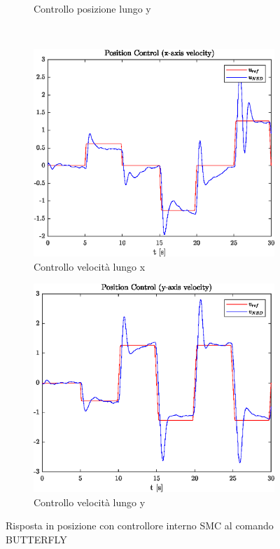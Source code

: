 \begin{figure}
\begin{subfigure}{0.45\textwidth}
		\caption{Controllo posizione lungo y}
	\end{subfigure}
	\\
	\begin{subfigure}{0.45\textwidth}
		\centering
		\includegraphics[width=1\textwidth]{Simulazioni/Figure/SMC/BUTTERFLY/PositionControlXVel}
		\caption{Controllo velocità lungo x}
	\end{subfigure}
	\hfill
	\begin{subfigure}{0.45\textwidth}
		\centering
		\includegraphics[width=1\textwidth]{Simulazioni/Figure/SMC/BUTTERFLY/PositionControlYVel}
		\caption{Controllo velocità lungo y}
	\end{subfigure}
	\caption{Risposta in posizione con controllore interno SMC al comando BUTTERFLY}
\end{figure}

